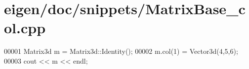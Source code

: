 \hypertarget{eigen_2doc_2snippets_2_matrix_base__col_8cpp_source}{}\section{eigen/doc/snippets/\+Matrix\+Base\+\_\+col.cpp}
\label{eigen_2doc_2snippets_2_matrix_base__col_8cpp_source}

\begin{DoxyCode}
00001 Matrix3d m = Matrix3d::Identity();
00002 m.col(1) = Vector3d(4,5,6);
00003 cout << m << endl;
\end{DoxyCode}
